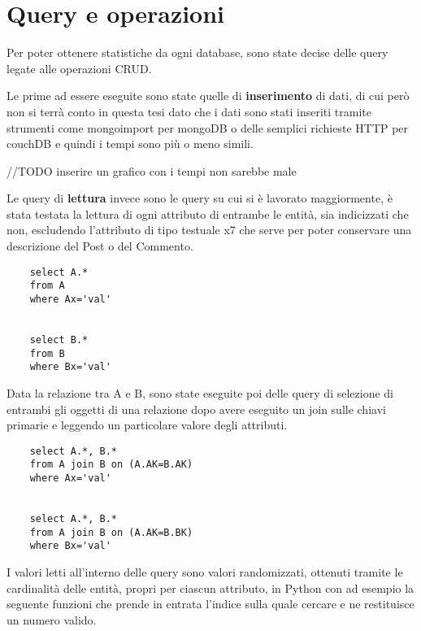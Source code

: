 \section{Query e operazioni}

Per poter ottenere statistiche da ogni database, sono state decise delle query legate alle operazioni CRUD.

Le prime ad essere eseguite sono state quelle di \textbf{inserimento} di dati, di cui però non si terrà conto in questa tesi dato che i dati sono 
stati inseriti tramite strumenti come mongoimport per mongoDB o delle semplici richieste HTTP per couchDB e quindi i tempi sono più o meno 
simili.

//TODO inserire un grafico con i tempi non sarebbe male

Le query di \textbf{lettura} invece sono le query su cui si è lavorato maggiormente, è stata testata la lettura di ogni attributo di entrambe le 
entità, sia indicizzati che non, escludendo l'attributo di tipo testuale x7 che serve per poter conservare una descrizione del Post o del Commento.

\begin{verbatim}
    select A.*
    from A
    where Ax='val'
    
    
    select B.*
    from B
    where Bx='val' 
\end{verbatim}

Data la relazione tra A e B, sono state eseguite poi delle query di selezione di entrambi gli oggetti di una relazione dopo avere eseguito un join 
sulle chiavi primarie e leggendo un particolare valore degli attributi.

\begin{verbatim}
    select A.*, B.*
    from A join B on (A.AK=B.AK)
    where Ax='val'


    select A.*, B.*
    from A join B on (A.AK=B.BK)
    where Bx='val'
\end{verbatim}

I valori letti all'interno delle query sono valori randomizzati, ottenuti tramite le cardinalità delle entità, propri per ciascun attributo, in Python con 
ad esempio la seguente funzioni che prende in entrata l'indice sulla quale cercare e ne restituisce un numero valido.

